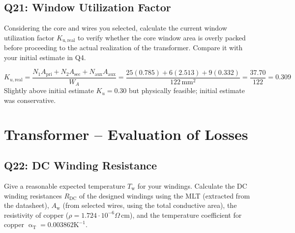 \documentclass{PELsmallreport}
\begin{document}
 \quad 
{}  \\ 
 \quad 
{} \\ 
 \quad 
{}
\hfill{}\\







\subsection{Q21: Window Utilization Factor} 
Considering the core and wires you selected, calculate the current window utilization factor $K_\mathrm{u,real}$ to verify whether the core window area is overly packed before proceeding to the actual realization of the transformer. 
Compare it with your initial estimate in Q4. 

\begin{framed}
\begin{equation}
    K_{u,\mathrm{real}} = \frac{N_1A_\mathrm{pri}+N_2A_\mathrm{sec}+N_\mathrm{aux}A_\mathrm{aux}}{W_A}
    =\frac{25(0.785)+6(2.513)+9(0.332)}{122\,\mathrm{mm}^2}=\frac{37.70}{122}=0.309
\end{equation}
Slightly above initial estimate $K_u=0.30$ but physically feasible; initial estimate was conservative.
\end{framed}

 \hfill{}













\newpage
\section{Transformer -- Evaluation of Losses}


\subsection{Q22: DC Winding Resistance} 
Give a reasonable expected temperature $T_\mathrm{w}$ for your windings.
Calculate the DC winding resistances $R_\mathrm{DC}$ of the designed windings using the MLT (extracted from the datasheet), $A_\mathrm{w}$ (from selected wires, using the total conductive area), the resistivity of copper ($\rho = 1.724 \cdot 10^{-6} \Omega \, \mathrm{cm}$), and the temperature coefficient for copper $\upalpha_\mathrm{T} = 0.003862 \mathrm{K}^{-1}$. 
\end{document}
